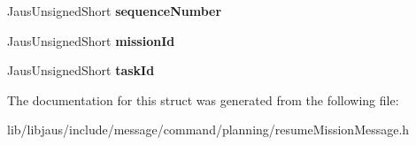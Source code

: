 \begin{DoxyCompactItemize}
\item 
\hypertarget{struct_resume_mission_message_struct_a9d2171093d66d080d08cc9c1fe6a00f3}{\-Jaus\-Unsigned\-Short {\bfseries sequence\-Number}}\label{struct_resume_mission_message_struct_a9d2171093d66d080d08cc9c1fe6a00f3}

\item 
\hypertarget{struct_resume_mission_message_struct_aa9df60f003df7572239b82ecd936d9fd}{\-Jaus\-Unsigned\-Short {\bfseries mission\-Id}}\label{struct_resume_mission_message_struct_aa9df60f003df7572239b82ecd936d9fd}

\item 
\hypertarget{struct_resume_mission_message_struct_a98f7cf9b05478af824a2abb5e883627c}{\-Jaus\-Unsigned\-Short {\bfseries task\-Id}}\label{struct_resume_mission_message_struct_a98f7cf9b05478af824a2abb5e883627c}

\end{DoxyCompactItemize}


\-The documentation for this struct was generated from the following file\-:\begin{DoxyCompactItemize}
\item 
lib/libjaus/include/message/command/planning/resume\-Mission\-Message.\-h\end{DoxyCompactItemize}
